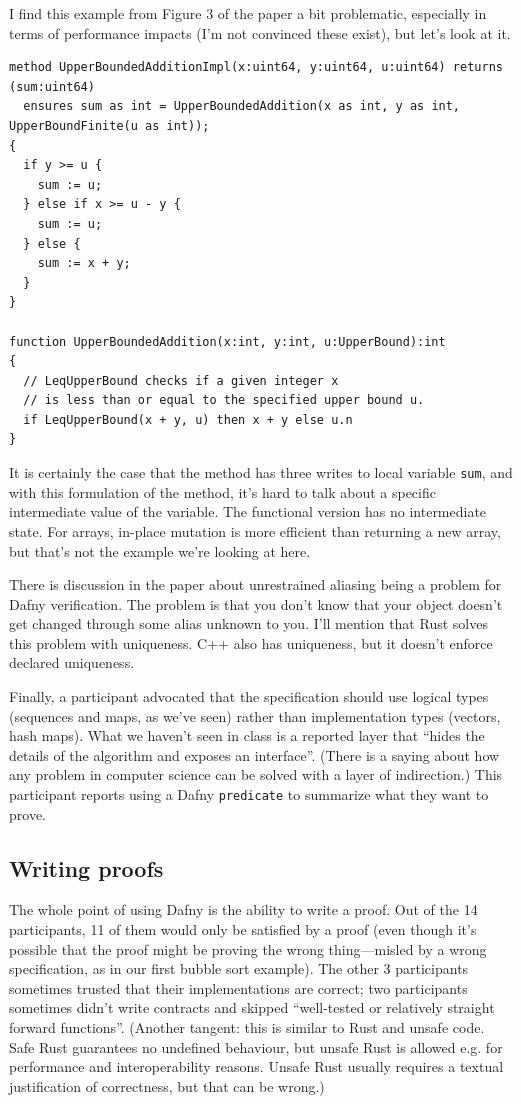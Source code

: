 \documentclass[11pt]{article}
\begin{document}
I find this example from Figure 3 of the paper a bit problematic, especially in terms of performance impacts (I'm not convinced these exist), but let's look at it.
\begin{lstlisting}[language=Dafny]
method UpperBoundedAdditionImpl(x:uint64, y:uint64, u:uint64) returns (sum:uint64)
  ensures sum as int = UpperBoundedAddition(x as int, y as int, UpperBoundFinite(u as int));
{
  if y >= u {
    sum := u;
  } else if x >= u - y {
    sum := u;
  } else {
    sum := x + y;
  }
}

function UpperBoundedAddition(x:int, y:int, u:UpperBound):int
{
  // LeqUpperBound checks if a given integer x
  // is less than or equal to the specified upper bound u.
  if LeqUpperBound(x + y, u) then x + y else u.n
}
\end{lstlisting}
It is certainly the case that the method has three writes to local variable \texttt{sum}, and with this formulation
of the method, it's hard to talk about a specific intermediate value of the variable. The functional version
has no intermediate state. For arrays, in-place mutation is more efficient than returning a new array,
but that's not the example we're looking at here.

There is discussion in the paper about unrestrained aliasing being a problem
for Dafny verification. The problem is that you don't know that your object doesn't get changed
through some alias unknown to you. I'll mention that Rust solves this problem with uniqueness.
C++ also has uniqueness, but it doesn't enforce declared uniqueness.

Finally, a participant advocated that the specification should use logical types (sequences and
maps, as we've seen) rather than implementation types (vectors, hash maps). What we haven't seen in class
is a reported layer that ``hides the details of the algorithm and exposes an interface''. (There is
a saying about how any problem in computer science can be solved with a layer of indirection.)
This participant reports using a Dafny \texttt{predicate} to summarize what they want to prove.

\subsection*{Writing proofs}
The whole point of using Dafny is the ability to write a proof. Out of the 14 participants,
11 of them would only be satisfied by a proof (even though it's possible that the proof
might be proving the wrong thing---misled by a wrong specification, as in our first bubble sort example). The other 3 participants sometimes trusted that their
implementations are correct; two participants sometimes didn't write contracts and skipped
``well-tested or relatively straight forward functions''. (Another tangent: this is similar to Rust and unsafe code.
Safe Rust guarantees no undefined behaviour, but unsafe Rust is allowed e.g. for performance
and interoperability reasons. Unsafe Rust usually requires a textual justification of
correctness, but that can be wrong.)
\end{document}

